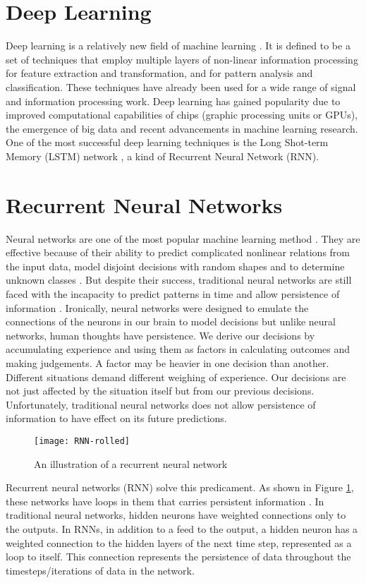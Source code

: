 \section{Deep Learning}
    Deep learning is a relatively new field of machine learning \citep{deng2014deep}. It is defined to be a set of techniques that employ multiple layers of non-linear information processing for feature extraction and transformation, and for pattern analysis and classification. These techniques have already been used for a wide range of signal and information processing work. Deep learning has gained popularity due to improved computational capabilities of chips (graphic processing units or GPUs), the emergence of big data and recent advancements in machine learning research. One of the most successful deep learning techniques is the Long Shot-term Memory (LSTM) network \citep{schmidhuber2015deep}, a kind of Recurrent Neural Network (RNN).

\section{Recurrent Neural Networks}
    Neural networks are one of the most popular machine learning method \citep{razi2005comparative}. They are effective because of their ability to predict complicated nonlinear relations from the input data, model disjoint decisions with random shapes and to determine unknown classes \citep{huang2006real}. But despite their success, traditional neural networks are still faced with the incapacity to predict patterns in time and allow persistence of information \citep{patan2008artificial}. Ironically, neural networks were designed to emulate the connections of the neurons in our brain to model decisions but unlike neural networks, human thoughts have persistence. We derive our decisions by accumulating experience and using them as factors in calculating outcomes and making judgements. A factor may be heavier in one decision than another. Different situations demand different weighing of experience. Our decisions are not just affected by the situation itself but from our previous decisions. Unfortunately, traditional neural networks does not allow persistence of information to have effect on its future predictions.

    \begin{figure}[H]
    \centering
    \texttt{[image: RNN-rolled]}
    \caption{An illustration of a recurrent neural network \citep{olah2015understanding}}
    \label{fig:rnn-rolled}
    \end{figure}
    Recurrent neural networks (RNN) solve this predicament. As shown in Figure \ref{fig:rnn-rolled}, these networks have loops in them that carries persistent information \citep{mikolov2010recurrent}. In traditional neural networks, hidden neurons have weighted connections only to the outputs. In RNNs, in addition to a feed to the output, a hidden neuron has a weighted connection to the hidden layers of the next time step, represented as a loop to itself. This connection represents the persistence of data throughout the timesteps/iterations of data in the network.

